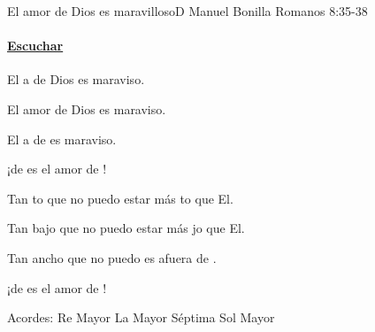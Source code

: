\documentclass[12pt, spanish]{book}
\newcommand{\NotCCLIed}{\relax}
\begin{document}
    \begin{song}{El amor de Dios es maravilloso}{D}
        {} %
        {Manuel Bonilla}
        {Romanos 8:35-38} %
        {} %
        \ifChordBk
        \paragraph{\mbox{}\hfill\protect\href{https://open.spotify.com/intl-es/track/7FY2TKHkES18qJ55X84XOJ}{Escuchar}\mbox{}\hfill}
        \fi

        \begin{SBOpGroup}
            El a de Dios es maraviso.

            El amor de Dios es maraviso.

            El a de  es maraviso.

            ¡de es el amor de !
        \end{SBOpGroup}

        \begin{SBChorus}
            Tan to que no puedo estar más to que El.

            Tan bajo que no puedo estar más jo que El.

            Tan ancho que no puedo es afuera de .

            ¡de es el amor de !
        \end{SBChorus}

        \ifChordBk
        \begin{SBOpGroup}
            Acordes:
            \upchord{\D}Re Mayor \hfill
            \upchord{\Aseven}\qquad La Mayor S\'eptima \hfill\null\break
            \upchord{\G}\qquad Sol Mayor \hfill
        \end{SBOpGroup}
        \fi
    \end{song}
\end{document}
